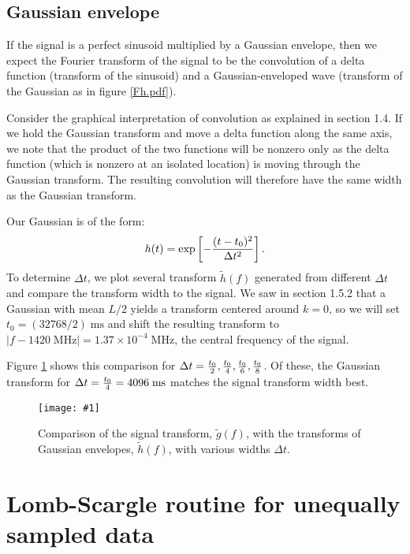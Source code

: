 \documentclass{article}
\theoremstyle{definition}
\newcommand{\un}[1]{\;\mathrm{#1}}
\newcommand{\plop}[2]{
    \begin{figure}\centering
        \texttt{[image: \#1]}
        \caption{\label{#1}#2}
    \end{figure}
}
\begin{document}
\subsection{Gaussian envelope}

If the signal is a perfect sinusoid multiplied by a Gaussian envelope,
then we expect the Fourier transform of the signal to be the convolution of
a delta function (transform of the sinusoid) and a Gaussian-enveloped
wave (transform of the Gaussian as in figure \ref{Fh.pdf}).

Consider the graphical interpretation of convolution as explained in section
1.4. If we hold the Gaussian transform and move a delta function along the
same axis, we note that the product of the two functions will be nonzero
only as the delta function (which is nonzero at an isolated location)
is moving through the Gaussian transform. The resulting
convolution will therefore have the same width as the Gaussian transform.

Our Gaussian is of the form:
\begin{align*}
h(t) = \exp\left[-{(t - t_0)^2 \over \Delta t^2}\right].
\end{align*}
To determine $\Delta t$, we plot several transform $\tilde h(f)$
generated from different $\Delta t$ and compare the transform width
to the signal. We saw in section 1.5.2 that a Gaussian with mean
$L/2$ yields a transform centered around $k = 0$, so we will
set $t_0 = (32768/2) \un{ms}$ and shift the resulting transform
to $|f - 1420\un{MHz}| = 1.37 \times 10^{-4} \un{MHz}$, the central
frequency of the signal.

Figure \ref{Fa1_comp.pdf} shows this comparison for $\Delta t =
{t_0 \over 2}, {t_0 \over 4}, {t_0 \over 6}, {t_0 \over 8}$. Of these,
the Gaussian transform for $\Delta t = {t_0 \over 4} = 4096\un{ms}$
matches the signal transform width best.
\plop{Fa1_comp.pdf}{Comparison of the signal transform, $\tilde g(f)$,
with the transforms of Gaussian envelopes, $\tilde h(f)$, with various
widths $\Delta t$.}

\section{Lomb-Scargle routine for unequally sampled data}
\end{document}
